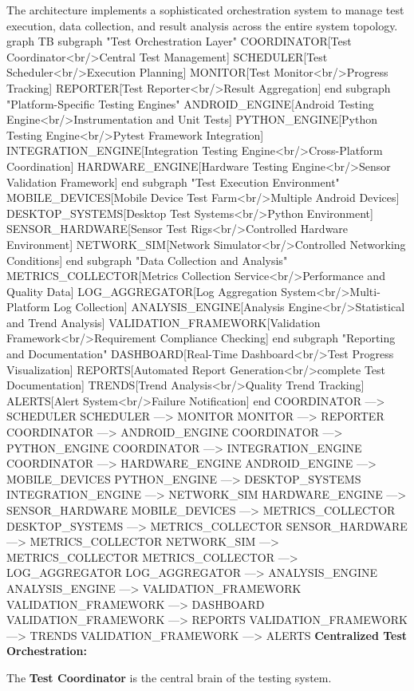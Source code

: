 {{{The architecture implements a sophisticated orchestration system to manage test execution, data collection, and result analysis across the entire system topology. graph TB subgraph "Test Orchestration Layer" COORDINATOR[Test Coordinator<br/>Central Test Management] SCHEDULER[Test Scheduler<br/>Execution Planning] MONITOR[Test Monitor<br/>Progress Tracking] REPORTER[Test Reporter<br/>Result Aggregation] end subgraph "Platform-Specific Testing Engines" ANDROID\_ENGINE[Android Testing Engine<br/>Instrumentation and Unit Tests] PYTHON\_ENGINE[Python Testing Engine<br/>Pytest Framework Integration] INTEGRATION\_ENGINE[Integration Testing Engine<br/>Cross-Platform Coordination] HARDWARE\_ENGINE[Hardware Testing Engine<br/>Sensor Validation Framework] end subgraph "Test Execution Environment" MOBILE\_DEVICES[Mobile Device Test Farm<br/>Multiple Android Devices] DESKTOP\_SYSTEMS[Desktop Test Systems<br/>Python Environment] SENSOR\_HARDWARE[Sensor Test Rigs<br/>Controlled Hardware Environment] NETWORK\_SIM[Network Simulator<br/>Controlled Networking Conditions] end subgraph "Data Collection and Analysis" METRICS\_COLLECTOR[Metrics Collection Service<br/>Performance and Quality Data] LOG\_AGGREGATOR[Log Aggregation System<br/>Multi-Platform Log Collection] ANALYSIS\_ENGINE[Analysis Engine<br/>Statistical and Trend Analysis] VALIDATION\_FRAMEWORK[Validation Framework<br/>Requirement Compliance Checking] end subgraph "Reporting and Documentation" DASHBOARD[Real-Time Dashboard<br/>Test Progress Visualization] REPORTS[Automated Report Generation<br/>complete Test Documentation] TRENDS[Trend Analysis<br/>Quality Trend Tracking] ALERTS[Alert System<br/>Failure Notification] end COORDINATOR ---> SCHEDULER SCHEDULER ---> MONITOR MONITOR ---> REPORTER COORDINATOR ---> ANDROID\_ENGINE COORDINATOR ---> PYTHON\_ENGINE COORDINATOR ---> INTEGRATION\_ENGINE COORDINATOR ---> HARDWARE\_ENGINE ANDROID\_ENGINE ---> MOBILE\_DEVICES PYTHON\_ENGINE ---> DESKTOP\_SYSTEMS INTEGRATION\_ENGINE ---> NETWORK\_SIM HARDWARE\_ENGINE ---> SENSOR\_HARDWARE MOBILE\_DEVICES ---> METRICS\_COLLECTOR DESKTOP\_SYSTEMS ---> METRICS\_COLLECTOR SENSOR\_HARDWARE ---> METRICS\_COLLECTOR NETWORK\_SIM ---> METRICS\_COLLECTOR METRICS\_COLLECTOR ---> LOG\_AGGREGATOR LOG\_AGGREGATOR ---> ANALYSIS\_ENGINE ANALYSIS\_ENGINE ---> VALIDATION\_FRAMEWORK VALIDATION\_FRAMEWORK ---> DASHBOARD VALIDATION\_FRAMEWORK ---> REPORTS VALIDATION\_FRAMEWORK ---> TRENDS VALIDATION\_FRAMEWORK ---> ALERTS \textbf{Centralized Test Orchestration:}

The \textbf{Test Coordinator}
 is the central brain of the testing system.

}}}
